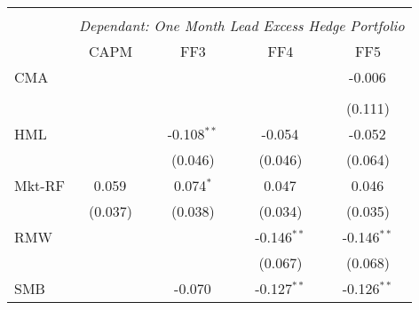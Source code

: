 \begin{table}[H] \centering
  \begin{tabular}{@{\extracolsep{5pt}}lcccc}
    \\[-1.8ex]\hline
    \hline                                                                                                                                                        \\[-1.8ex]
                   & \multicolumn{4}{c}{\textit{Dependant: One Month Lead Excess Hedge Portfolio}} \
    \cr \cline{2-5}
    \\[-1.8ex] & CAPM & FF3 & FF4 & FF5 \\
    \hline
    CMA            &                                                                                  &                   &                   & -0.006$^{}$       \\                                                                                                                                                    \\[-1.8ex]
                   &                                                                                  &                   &                   & (0.111)           \\
    HML            &                                                                                  & -0.108$^{**}$     & -0.054$^{}$       & -0.052$^{}$       \\
                   &                                                                                  & (0.046)           & (0.046)           & (0.064)           \\
    Mkt-RF         & 0.059$^{}$                                                                       & 0.074$^{*}$       & 0.047$^{}$        & 0.046$^{}$        \\
                   & (0.037)                                                                          & (0.038)           & (0.034)           & (0.035)           \\
    RMW            &                                                                                  &                   & -0.146$^{**}$     & -0.146$^{**}$     \\
                   &                                                                                  &                   & (0.067)           & (0.068)           \\
    SMB            &                                                                                  & -0.070$^{}$       & -0.127$^{**}$     & -0.126$^{**}$     \\

\end{tabular}
\end{table}
